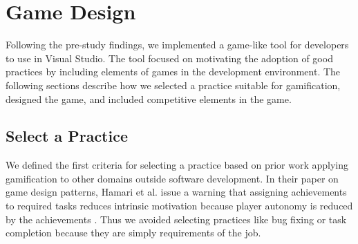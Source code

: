 \documentclass{sig-alternate}
\begin{document}
\section{Game Design}



Following the pre-study findings, we implemented a game-like tool for developers to use in Visual Studio.  The tool focused on motivating the adoption of good practices by including elements of games in the development environment.  The following sections describe how we selected a practice suitable for gamification, designed the game, and included competitive elements in the game.

\subsection{Select a Practice}

We defined the first criteria for selecting a practice based on prior work  applying gamification to other domains outside software development. 
In their paper on game design patterns, Hamari et al. issue a warning that assigning achievements to required tasks reduces intrinsic motivation because player autonomy is reduced by the achievements \cite{wbsnipes:Hamari2011Framework}.  Thus we avoided selecting practices like bug fixing or task completion because they are simply requirements of the job.  
\end{document}
